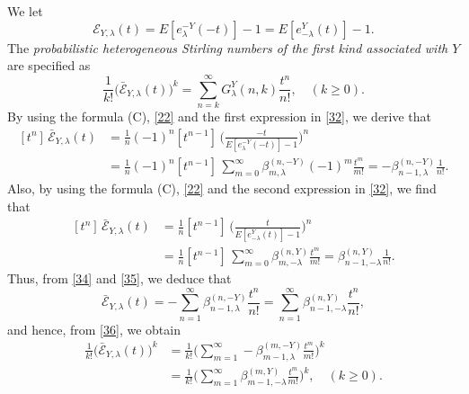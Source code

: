 \documentclass[a4paper,11pt]{amsart}
\begin{document}
We let
\begin{equation} \label{32}
\mathcal{E}_{Y,\lambda}(t)=E[e_{\lambda}^{-Y}(-t)]-1=E[e_{-\lambda}^{Y}(t)]-1. 
\end{equation}
The {\it{probabilistic heterogeneous Stirling numbers of the first kind associated with $Y$}} are specified as
\begin{equation} \label{33}
\frac{1}{k!}\Big(\bar{\mathcal{E}}_{Y,\lambda}(t)\Big)^{k}=\sum_{n=k}^{\infty}G_{\lambda}^{Y}(n,k)\frac{t^{n}}{n!},\quad (k \ge 0).
\end{equation}
By using the formula (C), \eqref{22} and the first expression in \eqref{32}, we derive that
\begin{equation} \label{34}
\begin{aligned}
[t^{n}]\,\bar{\mathcal{E}}_{Y,\lambda}(t)&=\frac{1}{n}(-1)^{n}[t^{n-1}]\,\bigg(\frac{-t}{E[e_{\lambda}^{-Y}(-t)]-1}\bigg)^{n} \\
&=\frac{1}{n}(-1)^{n}[t^{n-1}]\,\sum_{m=0}^{\infty}\beta_{m,\lambda}^{(n,-Y)}(-1)^{m}\frac{t^{m}}{m!}=-\beta_{n-1,\lambda}^{(n,-Y)}\frac{1}{n!}.
\end{aligned}
\end{equation}
Also, by using the formula (C), \eqref{22} and the second expression in \eqref{32}, we find that
\begin{equation} \label{35}
\begin{aligned}
[t^{n}]\,\bar{\mathcal{E}}_{Y,\lambda}(t)&=\frac{1}{n}[t^{n-1}]\,\bigg(\frac{t}{E[e_{-\lambda}^{Y}(t)]-1}\bigg)^{n} \\
&=\frac{1}{n}[t^{n-1}]\,\sum_{m=0}^{\infty}\beta_{m,-\lambda}^{(n,Y)}\frac{t^{m}}{m!}=\beta_{n-1,-\lambda}^{(n,Y)}\frac{1}{n!}.
\end{aligned}
\end{equation}
Thus, from \eqref{34} and \eqref{35}, we deduce that
\begin{equation} \label{36}
\bar{\mathcal{E}}_{Y,\lambda}(t)=-\sum_{n=1}^{\infty}\beta_{n-1,\lambda}^{(n,-Y)}\frac{t^{n}}{n!}=\sum_{n=1}^{\infty}\beta_{n-1,-\lambda}^{(n,Y)}\frac{t^{n}}{n!},
\end{equation}
and hence, from \eqref{36}, we obtain
\begin{equation} \label{37}
\begin{aligned}
\frac{1}{k!}\Big( \bar{\mathcal{E}}_{Y,\lambda}(t) \Big)^{k}&=\frac{1}{k!}\bigg(\sum_{m=1}^{\infty}-\beta_{m-1,\lambda}^{(m,-Y)}\frac{t^{m}}{m!} \bigg)^{k} \\
&=\frac{1}{k!}\bigg(\sum_{m=1}^{\infty}\beta_{m-1,-\lambda}^{(m,Y)}\frac{t^{m}}{m!} \bigg)^{k},\quad (k \ge 0).
\end{aligned}
\end{equation}
\end{document}
